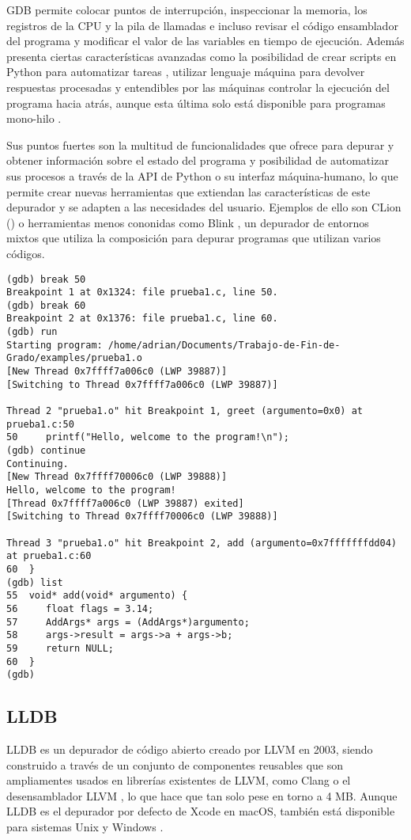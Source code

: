 GDB permite colocar puntos de interrupción, inspeccionar la memoria, los \gls{registros} de la CPU y la pila de llamadas e incluso revisar el código \gls{ensamblador} del programa y modificar el valor de las variables en tiempo de ejecución. Además presenta ciertas características avanzadas como la posibilidad de crear \glspl{script} en Python para automatizar tareas \cite{GDBPython}, utilizar \gls{lenguaje máquina} para devolver respuestas procesadas y entendibles por las máquinas \cite{GDB/MI} controlar la ejecución del programa hacia atrás, aunque esta última solo está disponible para programas mono-hilo \cite{GDBReversing}.

Sus puntos fuertes son la multitud de funcionalidades que ofrece para \gls{depurar} y obtener información sobre el estado del programa y posibilidad de automatizar sus \glspl{proceso} a través de la \gls{API} de Python o su \gls{interfaz máquina-humano}, lo que permite crear nuevas herramientas que extiendan las características de este \gls{depurador} y se adapten a las necesidades del usuario. Ejemplos de ello son CLion () o herramientas menos cononidas como Blink \cite{Blink}, un \gls{depurador} de entornos mixtos que utiliza la composición para \gls{depurar} programas que utilizan varios códigos.

\begin{lstlisting}[caption={Muestra del depurador GDB}]
(gdb) break 50
Breakpoint 1 at 0x1324: file prueba1.c, line 50.
(gdb) break 60
Breakpoint 2 at 0x1376: file prueba1.c, line 60.
(gdb) run
Starting program: /home/adrian/Documents/Trabajo-de-Fin-de-Grado/examples/prueba1.o 
[New Thread 0x7ffff7a006c0 (LWP 39887)]
[Switching to Thread 0x7ffff7a006c0 (LWP 39887)]

Thread 2 "prueba1.o" hit Breakpoint 1, greet (argumento=0x0) at prueba1.c:50
50	   printf("Hello, welcome to the program!\n");
(gdb) continue
Continuing.
[New Thread 0x7ffff70006c0 (LWP 39888)]
Hello, welcome to the program!
[Thread 0x7ffff7a006c0 (LWP 39887) exited]
[Switching to Thread 0x7ffff70006c0 (LWP 39888)]

Thread 3 "prueba1.o" hit Breakpoint 2, add (argumento=0x7fffffffdd04) at prueba1.c:60
60	}
(gdb) list
55	void* add(void* argumento) {
56	   float flags = 3.14;
57	   AddArgs* args = (AddArgs*)argumento;
58	   args->result = args->a + args->b;
59	   return NULL;
60	}
(gdb) 
\end{lstlisting}

\subsection{LLDB}{\label{subsec:lldb}}
LLDB es un \gls{depurador} de \gls{código abierto} creado por LLVM en 2003, siendo construido a través de un conjunto de componentes reusables que son ampliamentes usados en librerías existentes de LLVM, como Clang o el \gls{desensamblador} LLVM \cite{LLDB}, lo que hace que tan solo pese en torno a 4 MB.
Aunque LLDB es el depurador por defecto de Xcode en macOS, también está disponible para sistemas Unix y Windows \cite{LLDB}.

